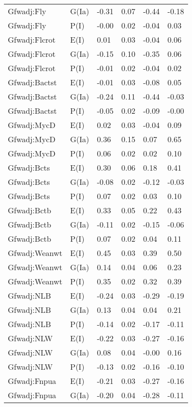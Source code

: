 \begin{center}
\begin{longtable}{|p{1.1in}|p{0.7in}|p{0.7in}|p{0.6in}|p{0.6in}|p{0.6in}|}
  Gfwadj:Fly & G(Ia) & -0.31 & 0.07 & -0.44 & -0.18 \\ 
  Gfwadj:Fly & P(I) & -0.00 & 0.02 & -0.04 & 0.03 \\ 
  Gfwadj:Flcrot & E(I) & 0.01 & 0.03 & -0.04 & 0.06 \\ 
  Gfwadj:Flcrot & G(Ia) & -0.15 & 0.10 & -0.35 & 0.06 \\ 
  Gfwadj:Flcrot & P(I) & -0.01 & 0.02 & -0.04 & 0.02 \\ 
  Gfwadj:Bactst & E(I) & -0.01 & 0.03 & -0.08 & 0.05 \\ 
  Gfwadj:Bactst & G(Ia) & -0.24 & 0.11 & -0.44 & -0.03 \\ 
  Gfwadj:Bactst & P(I) & -0.05 & 0.02 & -0.09 & -0.00 \\ 
  Gfwadj:MycD & E(I) & 0.02 & 0.03 & -0.04 & 0.09 \\ 
  Gfwadj:MycD & G(Ia) & 0.36 & 0.15 & 0.07 & 0.65 \\ 
  Gfwadj:MycD & P(I) & 0.06 & 0.02 & 0.02 & 0.10 \\ 
  Gfwadj:Bcts & E(I) & 0.30 & 0.06 & 0.18 & 0.41 \\ 
  Gfwadj:Bcts & G(Ia) & -0.08 & 0.02 & -0.12 & -0.03 \\ 
  Gfwadj:Bcts & P(I) & 0.07 & 0.02 & 0.03 & 0.10 \\ 
  Gfwadj:Bctb & E(I) & 0.33 & 0.05 & 0.22 & 0.43 \\ 
  Gfwadj:Bctb & G(Ia) & -0.11 & 0.02 & -0.15 & -0.06 \\ 
  Gfwadj:Bctb & P(I) & 0.07 & 0.02 & 0.04 & 0.11 \\ 
  Gfwadj:Weanwt & E(I) & 0.45 & 0.03 & 0.39 & 0.50 \\ 
  Gfwadj:Weanwt & G(Ia) & 0.14 & 0.04 & 0.06 & 0.23 \\ 
  Gfwadj:Weanwt & P(I) & 0.35 & 0.02 & 0.32 & 0.39 \\ 
  Gfwadj:NLB & E(I) & -0.24 & 0.03 & -0.29 & -0.19 \\ 
  Gfwadj:NLB & G(Ia) & 0.13 & 0.04 & 0.04 & 0.21 \\ 
  Gfwadj:NLB & P(I) & -0.14 & 0.02 & -0.17 & -0.11 \\ 
  Gfwadj:NLW & E(I) & -0.22 & 0.03 & -0.27 & -0.16 \\ 
  Gfwadj:NLW & G(Ia) & 0.08 & 0.04 & -0.00 & 0.16 \\ 
  Gfwadj:NLW & P(I) & -0.13 & 0.02 & -0.16 & -0.10 \\ 
  Gfwadj:Fnpua & E(I) & -0.21 & 0.03 & -0.27 & -0.16 \\ 
  Gfwadj:Fnpua & G(Ia) & -0.20 & 0.04 & -0.28 & -0.11 \\ 

\end{longtable}
\end{center}
